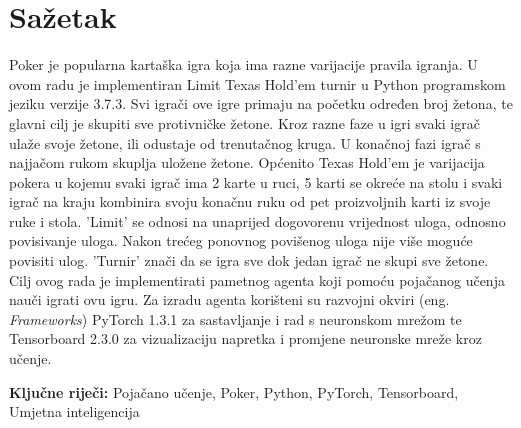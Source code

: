 \section*{Sažetak}
\label{sec:summary}
Poker je popularna kartaška igra koja ima razne varijacije pravila igranja. U ovom radu je implementiran Limit Texas Hold'em turnir u Python programskom jeziku verzije 3.7.3. Svi igrači ove igre primaju na početku određen broj žetona, te glavni cilj je skupiti sve protivničke žetone. Kroz razne faze u igri svaki igrač ulaže svoje žetone, ili odustaje od trenutačnog kruga. U konačnoj fazi igrač s najjačom rukom skuplja uložene žetone. Općenito Texas Hold'em je varijacija pokera u kojemu svaki igrač ima 2 karte u ruci, 5 karti se okreće na stolu i svaki igrač na kraju kombinira svoju konačnu ruku od pet proizvoljnih karti iz svoje ruke i stola. 'Limit' se odnosi na unaprijed dogovorenu vrijednost uloga, odnosno povisivanje uloga. Nakon trećeg ponovnog povišenog uloga nije više moguće povisiti ulog. 'Turnir' znači da se igra sve dok jedan igrač ne skupi sve žetone. Cilj ovog rada je implementirati pametnog agenta koji pomoću pojačanog učenja nauči igrati ovu igru. Za izradu agenta korišteni su razvojni okviri (eng. \textit{Frameworks}) PyTorch 1.3.1 za sastavljanje i rad s neuronskom mrežom te Tensorboard 2.3.0 za vizualizaciju napretka i promjene neuronske mreže kroz učenje.

\noindent
\textbf{Ključne riječi:} Pojačano učenje, Poker, Python, PyTorch, Tensorboard, Umjetna inteligencija
